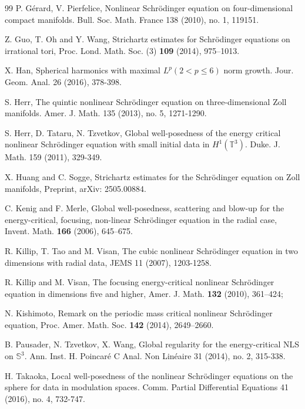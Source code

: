 \documentclass[11pt, reqno]{amsart}
\numberwithin{equation}{section}
\theoremstyle{definition}
\theoremstyle{remark}
\begin{document}
{\begin{thebibliography}{99}
 P. G\'{e}rard, V. Pierfelice,  Nonlinear Schr\"{o}dinger equation on four-dimensional compact manifolds. Bull. Soc. Math. France 138 (2010), no. 1, 119151.
			
 Z. Guo, T. Oh and Y. Wang, Strichartz estimates for Schr\"odinger equations on irrational tori, Proc. Lond. Math. Soc. (3) {\bf 109} (2014),  975--1013.
			
 X. Han, Spherical harmonics with maximal $L^p(2<p\le 6)$ norm growth. Jour. Geom. Anal. 26 (2016), 378-398.
			
 S. Herr, The quintic nonlinear Schr\"{o}dinger equation on three-dimensional Zoll manifolds. Amer. J. Math. 135 (2013), no. 5, 1271-1290.
						
 S. Herr, D. Tataru, N. Tzvetkov, Global well-posedness of the energy critical nonlinear Schr\"odinger equation with small initial data in $H^1(\mathbb{T}^3)$. Duke. J. Math. 159 (2011), 329-349.

		
 X. Huang and C. Sogge,  Strichartz estimates for the Schr\"odinger equation on Zoll manifolds, Preprint, arXiv: 2505.00884.
			
 C. Kenig and F. Merle, Global well-posedness, scattering and blow-up for the energy-critical, focusing, non-linear Schr\"odinger equation in the radial case, Invent. Math. {\bf 166} (2006),  645--675.

 R. Killip, T. Tao and M. Visan, The cubic nonlinear Schrödinger equation in two dimensions with radial data, JEMS 11 (2007), 1203-1258.

 R. Killip and M. Visan, The focusing energy-critical nonlinear Schr\"odinger equation in dimensions five and higher, Amer. J. Math. {\bf 132} (2010),  361--424;
			
 N. Kishimoto, Remark on the periodic mass critical nonlinear Schr\"odinger equation, Proc. Amer. Math. Soc. {\bf 142} (2014),  2649--2660.
		
			
 B. Pausader, N. Tzvetkov, X. Wang,  Global regularity for the energy-critical NLS on $\mathbb S^3$. Ann. Inst. H. Poincar\'{e} C Anal. Non Lin\'{e}aire 31 (2014), no. 2, 315-338.
			
 H. Takaoka, Local well-posedness of the nonlinear Schr\"{o}dinger equations on the sphere for data in modulation spaces. Comm. Partial Differential Equations 41 (2016), no. 4, 732-747.
			

\end{thebibliography}}
\end{document}

